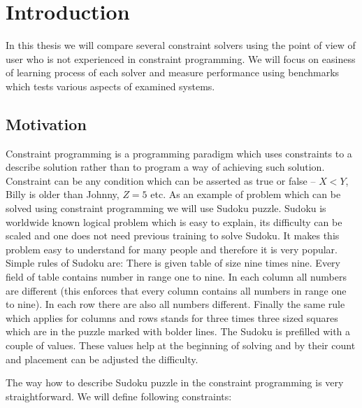 \chapter{Introduction}
\thispagestyle{myheadings}

In this thesis we will compare several constraint solvers using the point of view 
of user who is not experienced in constraint programming. We will focus on easiness 
of learning process of each solver and measure performance using benchmarks which 
tests various aspects of examined systems. 

\section{Motivation}
Constraint programming is a programming paradigm which uses constraints to a 
describe solution rather than to program a way of achieving such solution. 
Constraint can be any condition which can be asserted as true or false -- $X < Y$, 
Billy is older than Johnny, $Z = 5$ etc.  As an example of problem which can be 
solved using constraint programming we will use Sudoku puzzle. Sudoku is worldwide 
known logical problem which is easy to explain, its difficulty can be scaled and 
one does not need previous training to solve Sudoku. It makes this problem easy 
to understand for many people and therefore it is very popular. Simple rules of 
Sudoku are: There is given table of size nine times nine. Every field of table 
contains number in range one to nine. In each column all numbers are different 
(this enforces that every column contains all numbers in range one to nine). In 
each row there are also all numbers different. Finally the same rule which applies 
for columns and rows stands for three times three sized squares which are in the 
puzzle marked with bolder lines. The Sudoku is prefilled with a couple of values. 
These values help at the beginning of solving and by their count and placement 
can be adjusted the difficulty.


The way how to describe Sudoku puzzle in the constraint programming is very 
straightforward. We will define following constraints:

